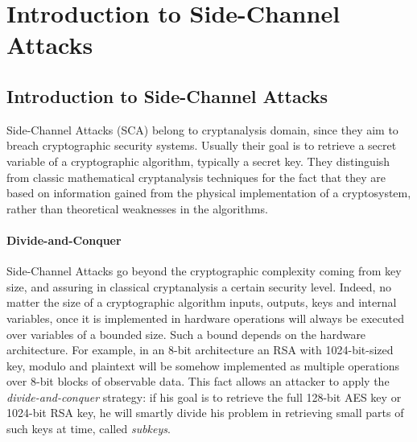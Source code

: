 \chapter{Introduction to Side-Channel Attacks} %

\label{ChapterIntroductionSCA}


\section{Introduction to Side-Channel Attacks}

Side-Channel Attacks (SCA) belong to cryptanalysis domain,  since they aim to breach cryptographic security systems. Usually their goal is to retrieve a secret variable of a cryptographic algorithm, typically a secret key. They distinguish from classic mathematical cryptanalysis techniques for the fact that they are based on information gained from the physical implementation of a cryptosystem, rather than theoretical weaknesses in the algorithms.  

\subsubsection{Divide-and-Conquer}
Side-Channel Attacks go beyond the cryptographic complexity coming from key size, and assuring in classical cryptanalysis a certain security level. Indeed, no matter the size of a cryptographic algorithm inputs, outputs, keys and internal variables, once it is implemented in hardware operations will always be executed over variables of a bounded size. Such a bound depends on the hardware architecture. For example, in an 8-bit architecture an RSA with 1024-bit-sized key, modulo and plaintext will be somehow implemented as multiple operations over 8-bit blocks of observable data. This fact allows an attacker to apply the \emph{divide-and-conquer} strategy: if his goal is to retrieve the full 128-bit AES key or 1024-bit RSA key, he will smartly divide his problem in retrieving small parts of such keys at time, called \emph{subkeys}. 

